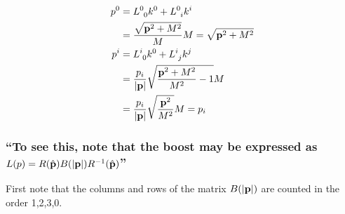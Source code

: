 \subsubsection{ }

\begin{align*} 
	p^0&=L^0_{\hphantom{0}0} k^0 +L^0_{\hphantom{0}i} k^i\\
	&=\dfrac{\sqrt{\mathbf{p}^2+M^2}}{M} M=\sqrt{\mathbf{p}^2+M^2}\\
	p^i&=L^i_{\hphantom{i}0} k^0 + L^i_{\hphantom{i}j} k^j\\
	&=\dfrac{p_i}{\abs{\mathbf{p}}}\sqrt{\dfrac{\mathbf{p}^2+M^2}{M^2}-1} M\\
	&=\dfrac{p_i}{\abs{\mathbf{p}}} \sqrt{\dfrac{\mathbf{p}^2}{M^2}}M=p_i
\end{align*}

\subsubsection{\enquote{To see this, note that the boost  may be expressed as $L(p)=R(\hat{\mathbf{p}})B(\abs{\mathbf{p}})R^{-1}(\hat{\mathbf{p}})$} }
First note that the columns and rows of the matrix $B(\abs{\mathbf{p}})$ are counted in the order 1,2,3,0.


